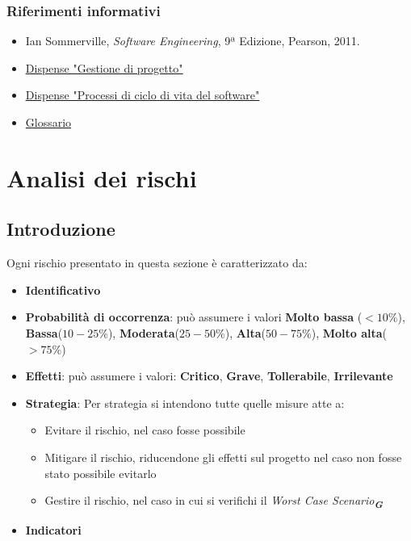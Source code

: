 \documentclass[a4paper,12pt]{article}
\newcommand{\glossario}[1]{\textit{#1}\textsubscript{\textbf{\textit{\textcolor{lightblack}{G}}}}}
\begin{document}
\subsubsection{Riferimenti informativi}
\begin{itemize}
    \item Ian Sommerville, \textit{Software Engineering}, 9ª Edizione, Pearson, 2011.
    \item \href{https://www.math.unipd.it/~tullio/IS-1/2025/Dispense/T04.pdf}{\ul{Dispense "Gestione di progetto"}}  
    \item \href{https://www.math.unipd.it/~tullio/IS-1/2025/Dispense/T02.pdf}{\ul{Dispense "Processi di ciclo di vita del software"}}  
    \item \href{https://7-zpus.github.io/Docs/assets/2_RTB/DocumentiInterni/Glossario.pdf}{Glossario} 
\end{itemize}



\section{Analisi dei rischi}

\subsection{Introduzione}
Ogni rischio presentato in questa sezione è caratterizzato da:
\begin{itemize}
    \item \textbf{Identificativo}
    \item \textbf{Probabilità di occorrenza}: può assumere i valori \textbf{Molto bassa} ($<10\%$), \textbf{Bassa}($10-25\%$), \textbf{Moderata}($25-50\%$), \textbf{Alta}($50-75\%$), \textbf{Molto alta}($>75\%$)
    \item \textbf{Effetti}: può assumere i valori: \textbf{Critico}, \textbf{Grave}, \textbf{Tollerabile}, \textbf{Irrilevante}
    \item \textbf{Strategia}: Per strategia si intendono tutte quelle misure atte a:
    \begin{itemize}
        \item Evitare il rischio, nel caso fosse possibile
        \item Mitigare il rischio, riducendone gli effetti sul progetto nel caso non fosse stato possibile evitarlo
        \item Gestire il rischio, nel caso in cui si verifichi il \glossario{Worst Case Scenario}
    \end{itemize}
    \item \textbf{Indicatori}
\end{itemize}
\end{document}
